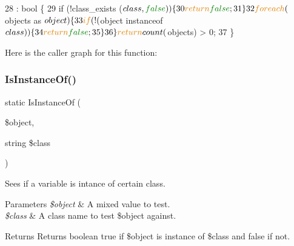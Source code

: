 \begin{DoxyCode}
28                                                                          : \textcolor{keywordtype}{bool} \{
29         \textcolor{keywordflow}{if} (!class\_exists ($class, \textcolor{keyword}{false})) \{
30             \textcolor{keywordflow}{return} \textcolor{keyword}{false};
31         \}
32         \textcolor{keywordflow}{foreach} ($objects as $object) \{
33             \textcolor{keywordflow}{if} (!($object instanceof $class)) \{
34                 \textcolor{keywordflow}{return} \textcolor{keyword}{false};
35             \}
36         \} \textcolor{keywordflow}{return} count ($objects) > 0;
37     \}
\end{DoxyCode}
Here is the caller graph for this function\+:
\mbox{\label{class_data_lib_a4ab5c189422f1366403e4375a42673d1}} 
\subsubsection{\texorpdfstring{Is\+Instance\+Of()}{IsInstanceOf()}}
{\footnotesize\ttfamily static Is\+Instance\+Of (\begin{DoxyParamCaption}\item[{}]{\$object,  }\item[{string}]{\$class }\end{DoxyParamCaption})\hspace{0.3cm}{\ttfamily [static]}}

Sees if a variable is intance of certain class. 
\begin{DoxyParams}{Parameters}
{\em \$object} & A mixed value to test. \\
\hline
{\em \$class} & A class name to test \$object against. \\
\hline
\end{DoxyParams}
\begin{DoxyReturn}{Returns}
Returns boolean true if \$object is instance of \$class and false if not. 
\end{DoxyReturn}

\mbox{\label{class_data_lib_a60cb59e0d64619154c155046e6e4ca66}} 

